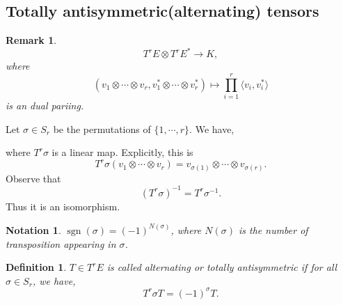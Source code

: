 \documentclass[8pt]{article}
\newtheorem{definition}{Definition}[section]
\newtheorem{notation}{Notation}[section]
\newtheorem{remark}{Remark}[section]
\DeclareMathOperator{\sgn}{sgn}
\begin{document}
\subsection{Totally antisymmetric(alternating) tensors}
\begin{remark}
  \begin{equation*}
    T^rE\otimes T^rE^*\to K,
  \end{equation*}
  where 
  \begin{equation*}
    (v_1\otimes\cdots\otimes v_r,v_1^*\otimes\cdots\otimes v_r^*)\mapsto \prod_{i=1}^r\langle v_i,v_i^*\rangle
  \end{equation*}
  is an dual pariing. 
\end{remark}
Let $\sigma\in S_r$ be the permutations of $\{1,\cdots,r\}$. We have,
\begin{center}
\end{center}
where $T^r\sigma$ is a linear map. Explicitly, this is
\begin{equation*}
  T^r\sigma(v_1\otimes \cdots\otimes v_r) = v_{\sigma(1)}\otimes\cdots\otimes v_{\sigma(r)}.
\end{equation*}
Observe that
\begin{equation*}
  (T^r\sigma)^{-1}= T^r{\sigma}^{-1}.
\end{equation*}
Thus it is an isomorphism.
\begin{notation}
  $\sgn(\sigma) = (-1)^{N(\sigma)}$, where $N(\sigma)$ is the number of transposition appearing in $\sigma$.
\end{notation}

\begin{definition}
  $T\in T^rE$ is called alternating or totally antisymmetric if for all $\sigma\in S_r$, we have,
  \begin{equation*}
    T^r\sigma T = (-1)^{\sigma}T.
  \end{equation*}
\end{definition}
\end{document}
